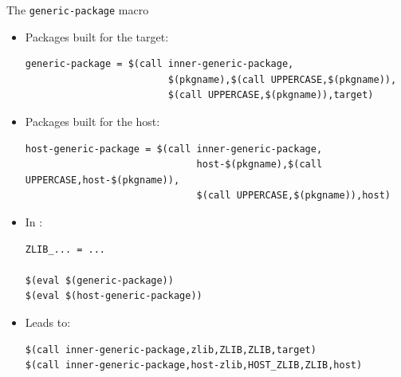 \begin{frame}[fragile]{The {\tt generic-package} macro}

\begin{itemize}
\item Packages built for the target:
\begin{block}{}
\begin{verbatim}
generic-package = $(call inner-generic-package,
                         $(pkgname),$(call UPPERCASE,$(pkgname)),
                         $(call UPPERCASE,$(pkgname)),target)
\end{verbatim}
\end{block}

\item Packages built for the host:
\begin{block}{}
\begin{verbatim}
host-generic-package = $(call inner-generic-package,
                              host-$(pkgname),$(call UPPERCASE,host-$(pkgname)),
                              $(call UPPERCASE,$(pkgname)),host)
\end{verbatim}
\end{block}

\item In :
\begin{block}{}
\begin{verbatim}
ZLIB_... = ...

$(eval $(generic-package))
$(eval $(host-generic-package))
\end{verbatim}
\end{block}

\item Leads to:
\begin{block}{}
\begin{verbatim}
$(call inner-generic-package,zlib,ZLIB,ZLIB,target)
$(call inner-generic-package,host-zlib,HOST_ZLIB,ZLIB,host)
\end{verbatim}
\end{block}

\end{itemize}

\end{frame}

